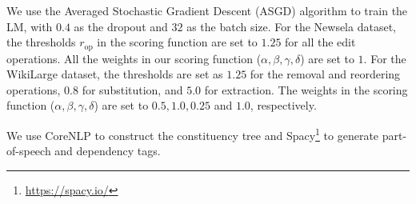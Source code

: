 \documentclass[11pt,a4paper]{article}
\begin{document}
We use the Averaged Stochastic Gradient Descent (ASGD) algorithm \cite{polyak1992acceleration} to train the LM, with $0.4$ as the dropout and $32$ as the batch size. For the Newsela dataset, the thresholds $r_{\operatorname{op}}$ in the scoring function are set to $1.25$ for all the edit operations. All the weights in our scoring function ($\alpha, \beta,\gamma,\delta$) are set to $1$. For the WikiLarge dataset, the thresholds are set as $1.25$ for the removal and reordering operations, $0.8$ for substitution, and $5.0$ for extraction. The weights in the scoring function ($\alpha,\beta,\gamma,\delta$) are set to $0.5, 1.0, 0.25$ and $1.0$, respectively.  

We use CoreNLP \cite{manning2014stanford} to construct the constituency tree and Spacy\footnote{\url{https://spacy.io/}} to generate part-of-speech and dependency tags.
\end{document}
